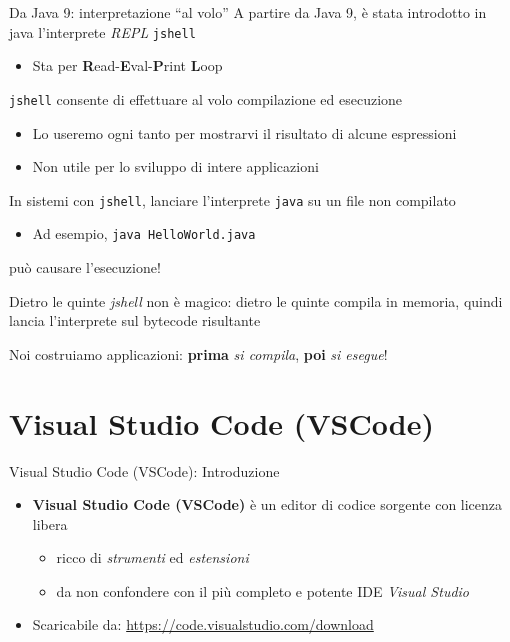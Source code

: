 \documentclass[xcolor=dvipsnames,presentation]{beamer}
\begin{document}
\begin{frame}{Da Java 9: interpretazione ``al volo''}
    A partire da Java 9, è stata introdotto in java l'interprete \textit{REPL} \texttt{jshell}
    \begin{itemize}
        \item Sta per \textbf{R}ead-\textbf{E}val-\textbf{P}rint \textbf{L}oop
    \end{itemize}
    \texttt{jshell} consente di effettuare al volo compilazione ed esecuzione
    \begin{itemize}
        \item Lo useremo ogni tanto per mostrarvi il risultato di alcune espressioni
        \item Non utile per lo sviluppo di intere applicazioni
    \end{itemize}
    In sistemi con \texttt{jshell}, lanciare l'interprete \texttt{java} su un file non compilato
    \begin{itemize}
        \item Ad esempio, \texttt{java HelloWorld.java}
    \end{itemize}
    può causare l'esecuzione!
    \begin{block}{Dietro le quinte}
        \textit{jshell} non è magico: dietro le quinte compila in memoria, quindi lancia l'interprete sul bytecode risultante
    \end{block}
    Noi costruiamo applicazioni: \textbf{prima} \textit{si compila}, \textbf{poi} \textit{si esegue}!
\end{frame}

\section{Visual Studio Code (VSCode)}


\begin{frame}[fragile]{Visual Studio Code (VSCode): Introduzione}

\begin{itemize}
\item \textbf{Visual Studio Code (VSCode)} è un editor di codice sorgente con licenza libera
	\begin{itemize}
	\item ricco di \emph{strumenti} ed \emph{estensioni}
	\item da non confondere con il più completo e potente IDE \emph{Visual Studio}
	\end{itemize}
\item Scaricabile da: \url{https://code.visualstudio.com/download}
\end{itemize}

\end{frame}
\end{document}
